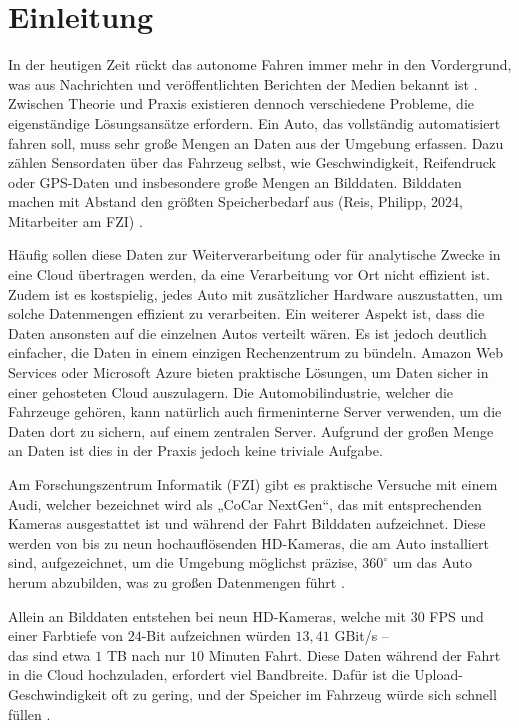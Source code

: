 \chapter{Einleitung}
    In der heutigen Zeit rückt das autonome Fahren immer mehr in den Vordergrund, was aus Nachrichten und veröffentlichten Berichten der Medien bekannt ist \cite{autonom}. Zwischen Theorie und Praxis existieren dennoch verschiedene Probleme, die eigenständige Lösungsansätze erfordern. 
    Ein Auto, das vollständig automatisiert fahren soll, muss sehr große Mengen an Daten aus der Umgebung erfassen. Dazu zählen Sensordaten über das Fahrzeug selbst, wie Geschwindigkeit, Reifendruck oder GPS-Daten und insbesondere große Mengen an Bilddaten. Bilddaten machen mit Abstand den größten Speicherbedarf aus (Reis, Philipp, 2024, Mitarbeiter am FZI) \cite{overload}.
    
    Häufig sollen diese Daten zur Weiterverarbeitung oder für analytische Zwecke in eine Cloud übertragen werden, da eine Verarbeitung vor Ort nicht effizient ist. Zudem ist es kostspielig, jedes Auto mit zusätzlicher Hardware auszustatten, um solche Datenmengen effizient zu verarbeiten. Ein weiterer Aspekt ist, dass die Daten ansonsten auf die einzelnen Autos verteilt wären. Es ist jedoch deutlich einfacher, die Daten in einem einzigen Rechenzentrum zu bündeln.
    Amazon Web Services oder Microsoft Azure bieten praktische Lösungen, um Daten sicher in einer gehosteten Cloud auszulagern. Die Automobilindustrie, welcher die Fahrzeuge gehören, kann natürlich auch firmeninterne Server verwenden, um die Daten dort zu sichern, auf einem zentralen Server. Aufgrund der großen Menge an Daten ist dies in der Praxis jedoch keine triviale Aufgabe.
    
    Am Forschungszentrum Informatik (FZI) gibt es praktische Versuche mit einem Audi, welcher bezeichnet wird als „CoCar NextGen“, das mit entsprechenden Kameras ausgestattet ist und während der Fahrt Bilddaten aufzeichnet.
    Diese werden von bis zu neun hochauflösenden HD-Kameras, die am Auto installiert sind, aufgezeichnet, um die Umgebung möglichst präzise, $360^\circ$ um das Auto herum abzubilden, was zu großen Datenmengen führt \cite{fzi_car}. 
    
    Allein an Bilddaten entstehen bei neun HD-Kameras, welche mit $30$ FPS und einer Farbtiefe von $24$-Bit aufzeichnen würden $13,41$ GBit/s –\\ das sind etwa $1$ TB nach nur $10$ Minuten Fahrt. Diese Daten während der Fahrt in die Cloud hochzuladen, erfordert viel Bandbreite. Dafür ist die Upload-Geschwindigkeit oft zu gering, und der Speicher im Fahrzeug würde sich schnell füllen \cite{overload}.
    
